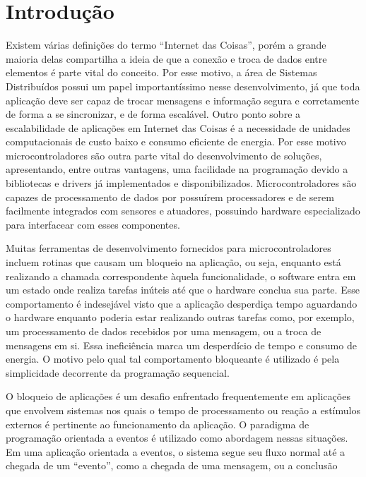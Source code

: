 \documentclass[11pt]{article}
\begin{document}
\section{Introdução}	


\tab Existem várias definições do termo “Internet das
Coisas”, porém a grande maioria delas compartilha a ideia de que a conexão e troca de dados
entre elementos é parte vital do conceito. Por esse motivo, a área de Sistemas Distribuídos possui um
papel importantíssimo nesse desenvolvimento, já que toda aplicação deve ser capaz de trocar
mensagens e informação segura e corretamente de forma a se sincronizar, e de forma escalável.\cite{singh2014}\cite{wortmann2015}\cite{chui2010}
Outro ponto sobre a escalabilidade de aplicações em Internet das Coisas é a necessidade de unidades
computacionais de custo baixo e consumo eficiente de energia. Por esse motivo microcontroladores
são outra parte vital do desenvolvimento de soluções, apresentando, entre outras vantagens, uma
facilidade na programação devido a bibliotecas e drivers já implementados e disponibilizados.
Microcontroladores são capazes de processamento de dados por possuírem processadores e de
serem facilmente integrados com sensores e atuadores, possuindo hardware especializado para
interfacear com esses componentes.\cite{edwards1997}
\par Muitas ferramentas de desenvolvimento fornecidos para microcontroladores incluem rotinas que causam um bloqueio na
aplicação, ou seja, enquanto está realizando a chamada correspondente àquela funcionalidade, o
software entra em um estado onde realiza tarefas inúteis até que o hardware conclua sua
parte. Esse comportamento é indesejável visto que a aplicação desperdiça tempo aguardando o
hardware enquanto poderia estar realizando outras tarefas como, por exemplo, um processamento de
dados recebidos por uma mensagem, ou a troca de mensagens em si. Essa ineficiência marca um
desperdício de tempo e consumo de energia. O motivo pelo qual tal comportamento bloqueante é utilizado é pela simplicidade decorrente da programação sequencial.
\par O bloqueio de aplicações é um desafio enfrentado frequentemente em aplicações que envolvem
sistemas nos quais o tempo de processamento ou reação a estímulos externos é pertinente ao
funcionamento da aplicação. O paradigma de programação orientada a eventos é utilizado como abordagem nessas situações. Em uma aplicação orientada a eventos, o sistema segue
seu fluxo normal até a chegada de um “evento”, como a chegada de uma mensagem, ou a conclusão
\end{document}
